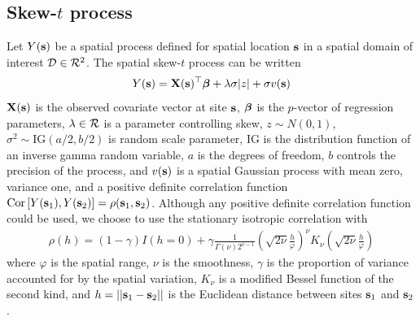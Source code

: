 \documentclass[useAMS,usenatbib,referee]{biom}
\begin{document}
\subsection{Skew-$t$ process} \label{sts:skewt}
Let $Y(\mbox{\bf s})$ be a spatial process defined for spatial location $\mbox{\bf s}$ in a spatial domain of interest $\calD \in \calR^2$.
The spatial skew-$t$ process can be written
\begin{align}
  Y(\bs) = \bX(\bs)^\top \bbeta + \lambda \sigma |z| + \sigma v(\bs) \label{steq:fullmodel}
\end{align}
$\mbox{\bf X}(\mbox{\bf s})$ is the observed covariate vector at site $\mbox{\bf s}$, $\mbox{\boldmath $\beta$}$ is the $p$-vector of regression parameters, $\lambda \in \calR$ is a parameter controlling skew, $z \sim N(0, 1)$, $\sigma^2 \sim \text{IG}(a / 2, b / 2)$ is random scale parameter, IG is the distribution function of an inverse gamma random variable, $a$ is the degrees of freedom, $b$ controls the precision of the process, and $v(\mbox{\bf s})$ is a spatial Gaussian process with mean zero, variance one, and a positive definite correlation function $\text{Cor} \left[Y(\mbox{\bf s}_1), Y(\mbox{\bf s}_2)\right] = \rho(\mbox{\bf s}_1, \mbox{\bf s}_2)$.
Although any positive definite correlation function could be used, we choose to use the stationary isotropic \Matern correlation with
\begin{align}
  \rho(h) = (1 - \gamma) I(h = 0) + \gamma \frac{ 1 }{ \Gamma(\nu) 2^{ \nu - 1}} \left( \sqrt{2\nu} \frac{ h }{ \varphi } \right)^{\nu} K_{\nu} \left( \sqrt{2\nu} \frac{ h }{ \varphi } \right) \label{steq:matern}
\end{align}
where $\varphi$ is the spatial range, $\nu$ is the smoothness, $\gamma$ is the proportion of variance accounted for by the spatial variation, $K_\nu$ is a modified Bessel function of the second kind, and $h = || \mbox{\bf s}_1 - \mbox{\bf s}_2 ||$ is the Euclidean distance between sites $\mbox{\bf s}_1$ and $\mbox{\bf s}_2$.
\end{document}
